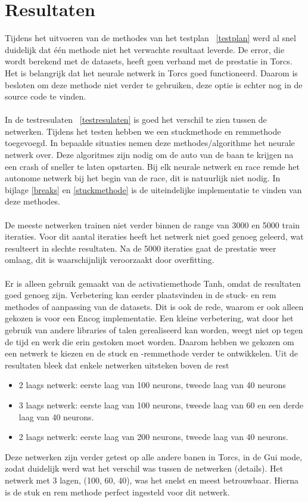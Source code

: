 \documentclass{article}
\begin{document}
\section{Resultaten}
Tijdens het uitvoeren van de methodes van het testplan ~\ref{testplan} werd al snel duidelijk dat \'e\'en methode niet het verwachte resultaat leverde. De error, die wordt berekend met de datasets, heeft geen verband met de prestatie in Torcs. Het is belangrijk dat het neurale netwerk in Torcs goed functioneerd. Daarom is besloten om deze methode niet verder te gebruiken, deze optie is echter nog in de source code te vinden. \\\\
In de testresulaten ~\ref{testresulaten} is goed het verschil te zien tussen de netwerken. Tijdens het testen hebben we een stuckmethode en remmethode toegevoegd. In bepaalde situaties nemen deze methodes/algorithme het neurale netwerk over. Deze algoritmes zijn nodig om de auto van de baan te krijgen na een crash of sneller te laten opstarten. Bij elk neurale netwerk en race remde het autonome netwerk bij het begin van de race, dit is natuurlijk niet nodig. In bijlage \ref{breaks} en \ref{stuckmethode} is de uiteindelijke implementatie te vinden van deze methodes. \\\\
De meeste netwerken trainen niet verder binnen de range van 3000 en 5000 train iteraties. Voor dit aantal iteraties heeft het netwerk niet goed genoeg geleerd, wat resulteert in slechte resultaten. Na de 5000 iteraties gaat de prestatie weer omlaag, dit is waarschijnlijk veroorzaakt door overfitting. \\\\
Er is alleen gebruik gemaakt van de activatiemethode Tanh, omdat de resultaten goed genoeg zijn. Verbetering kan eerder plaatsvinden in de stuck- en rem methodes of aanpassing van de datasets. Dit is ook de rede, waarom er ook alleen gekozen is voor een Encog implementatie. Een kleine verbetering, wat door het gebruik van andere libraries of talen gerealiseerd kan worden, weegt niet op tegen de tijd en werk die erin gestoken moet worden. Daarom hebben we gekozen om een netwerk te kiezen en de stuck en -remmethode verder te ontwikkelen. Uit de resultaten bleek dat enkele netwerken uitsteken boven de rest
\begin{itemize}
\item 2 laags netwerk: eerste laag van 100 neurons, tweede laag van 40 neurons
\item 3 laags netwerk: eerste laag van 100 neurons, tweede laag van 60 en een derde laag van 40 neurons.
\item 2 laags netwerk: eerste laag van 200 neurons, tweede laag van 40 neurons. 
\end{itemize}
Deze netwerken zijn verder getest op alle andere banen in Torcs, in de Gui mode, zodat duidelijk werd wat het verschil was tussen de netwerken (details). Het netwerk met 3 lagen, (100, 60, 40), was het snelst en meest betrouwbaar. Hierna is de stuk en rem methode perfect ingesteld voor dit netwerk.
 \pagebreak
\end{document}
